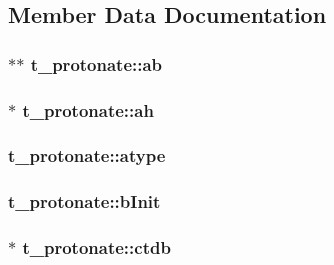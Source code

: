 \subsection{\-Member \-Data \-Documentation}
\hypertarget{structt__protonate_aff0d02f8787f57c387e52de040c5e402}{
\subsubsection[{ab}]{ $\ast$$\ast$ {\bf t\-\_\-protonate\-::ab}}}\label{structt__protonate_aff0d02f8787f57c387e52de040c5e402}
\hypertarget{structt__protonate_a9a1267245f8d9e479835de82909f5233}{
\subsubsection[{ah}]{ $\ast$ {\bf t\-\_\-protonate\-::ah}}}\label{structt__protonate_a9a1267245f8d9e479835de82909f5233}
\hypertarget{structt__protonate_ad25ec2be60fa9e54f569309e56f0e61e}{
\subsubsection[{atype}]{ {\bf t\-\_\-protonate\-::atype}}}\label{structt__protonate_ad25ec2be60fa9e54f569309e56f0e61e}
\hypertarget{structt__protonate_a8290815626bfc9c61018e18676c82664}{
\subsubsection[{b\-Init}]{ {\bf t\-\_\-protonate\-::b\-Init}}}\label{structt__protonate_a8290815626bfc9c61018e18676c82664}
\hypertarget{structt__protonate_abbba436e07c0e9547436ebe40bab4e22}{
\subsubsection[{ctdb}]{ $\ast$ {\bf t\-\_\-protonate\-::ctdb}}}\label{structt__protonate_abbba436e07c0e9547436ebe40bab4e22}
